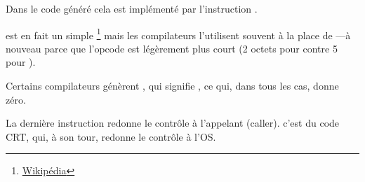 Dans le code généré cela est implémenté par l'instruction .


\XOR est en fait un simple \footnote{\href{http://go.yurichev.com/17118}{Wikipédia}} mais
les compilateurs l'utilisent souvent à la place de ---à nouveau parce que l'opcode est légèrement plus
court (2 octets pour \XOR contre 5 pour \MOV).

Certains compilateurs génèrent , qui signifie  \EAX {} \EAX,
 ce qui, dans tous les cas, donne zéro.

La dernière instruction \RET redonne le contrôle à l'appelant (\gls{caller}). c'est du code \CCpp \ac{CRT}, qui, à son tour, redonne le contrôle à l'\ac{OS}.


